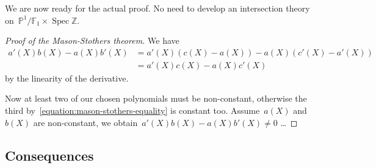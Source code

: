 \documentclass[11pt, a4paper, openany, oneside, article]{memoir}
\theoremstyle{definition}
\begin{document}
We are now ready for the actual proof. No need to develop an intersection theory on~$\mathbb{P}^1/\mathbb{F}_1\times\operatorname{Spec}\mathbb{Z}$.

\begin{proof}[Proof of the Mason-Stothers theorem]
  We have
  \begin{equation}
    \begin{aligned}
      a'(X)b(X)-a(X)b'(X)&=a'(X)\left( c(X)-a(X) \right)-a(X)\left( c'(X)-a'(X) \right) \\
      &=a'(X)c(X)-a(X)c'(X)
    \end{aligned}
  \end{equation}
  by the linearity of the derivative.

  Now at least two of our chosen polynomials must be non-constant, otherwise the third by~\eqref{equation:mason-stothers-equality} is constant too. Assume~$a(X)$ and~$b(X)$ are non-constant, we obtain~$a'(X)b(X)-a(X)b'(X)\neq 0$ \dots{}
\end{proof}

\subsection{Consequences}




\end{document}
